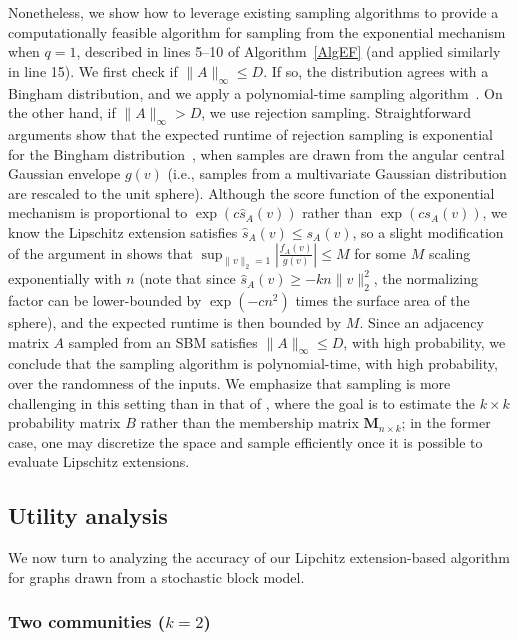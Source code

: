 \documentclass{article}
\begin{document}
Nonetheless, we show how to leverage existing sampling algorithms to provide a computationally feasible algorithm for sampling from the exponential mechanism when $q=1$, described in lines 5--10 of Algorithm~\ref{AlgEF} (and applied similarly in line 15). We first check if $\|A\|_\infty \le D$. If so, the distribution agrees with a Bingham distribution, and we apply a polynomial-time sampling algorithm~\cite{kapralov2013differentially, ge2021efficient}. On the other hand, if $\|A\|_\infty > D$, we use rejection sampling. Straightforward arguments show that the expected runtime of rejection sampling is exponential for the Bingham distribution~\cite{kapralov2013differentially, kent2013new}, when samples are drawn from the angular central Gaussian envelope $g(v)$ (i.e., samples from a multivariate Gaussian distribution are rescaled to the unit sphere). Although the score function of the exponential mechanism is proportional to $\exp(c\widehat{s}_A(v))$ rather than $\exp(c s_A(v))$, we know the Lipschitz extension satisfies $\widehat{s}_A(v) \le s_A(v)$, so a slight modification of the argument in \cite{kent2013new} shows that $\sup_{\|v\|_2 = 1} \left|\frac{f_A(v)}{g(v)}\right| \le M$ for some $M$ scaling exponentially with $n$ (note that since $\widehat{s}_A(v) \ge -k n \|v\|_2^2$, the normalizing factor can be lower-bounded by $\exp(-cn^2)$ times the surface area of the sphere), and the expected runtime is then bounded by $M$. Since an adjacency matrix $A$ sampled from an SBM satisfies $\|A\|_\infty \le D$, with high probability, we conclude that the sampling algorithm is polynomial-time, with high probability, over the randomness of the inputs. We emphasize that sampling is more challenging in this setting than in that of \cite{chen2024private}, where the goal is to estimate the $k \times k$ probability matrix $B$ rather than the membership matrix $\mathbf{M}_{n \times k}$; in the former case, one may discretize the space and sample efficiently once it is possible to evaluate Lipschitz extensions.


\subsection{Utility analysis}

We now turn to analyzing the accuracy of our Lipchitz extension-based algorithm for graphs drawn from a stochastic block model.

\subsubsection{Two communities ($k = 2$)}
\label{SecTwoPCA}
\end{document}
